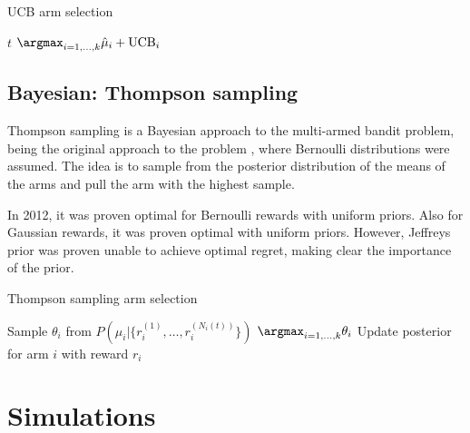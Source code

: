 \begin{algorithm}
    \caption{UCB arm selection}
    \label{alg:ucb}
    \begin{algorithmic}
        \State \Return $t$
        \Else
        \State \Return $\argmax_{i=1,\dots,k} \hat{\mu}_i + \text{UCB}_i$
        \EndIf
    \end{algorithmic}
\end{algorithm}




\subsection{Bayesian: Thompson sampling}
Thompson sampling is a Bayesian approach to the multi-armed bandit problem, being the original approach to the problem \cite{thompson1933}, where Bernoulli distributions were assumed.
The idea is to sample from the posterior distribution of the means of the arms and pull the arm with the highest sample.

In 2012, it was proven optimal for Bernoulli rewards \cite{kaufmann2012} with uniform priors.
Also for Gaussian rewards, it was proven optimal \cite{honda2014} with uniform priors.
However, Jeffreys prior was proven unable to achieve optimal regret, making clear the importance of the prior.

\begin{algorithm}
    \caption{Thompson sampling arm selection}
    \label{alg:thompson}
    \begin{algorithmic}
        \State Sample $\theta_i$ from $P(\mu_i | \{r_i^{(1)}, \dots, r_i^{(N_i(t))}\})$
        \EndFor
        \State \Return $\argmax_{i=1,\dots,k} \theta_i$
        \State Update posterior for arm $i$ with reward $r_i$
    \end{algorithmic}
\end{algorithm}

\section{Simulations}